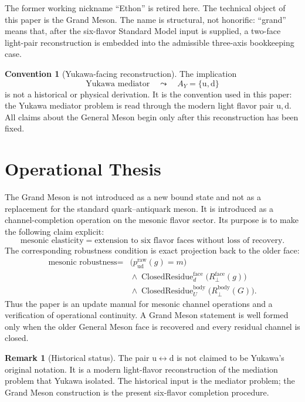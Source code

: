 \documentclass[11pt]{article}
\theoremstyle{definition}
\newtheorem{remark}[definition]{Remark}
\newtheorem{convention}[definition]{Convention}
\theoremstyle{plain}
\DeclareMathOperator{\ClosedResidue}{ClosedResidue}
\newcommand{\qu}{\mathrm u}
\newcommand{\qd}{\mathrm d}
\begin{document}
The former working nickname ``Ethon'' is retired here.  The technical
object of this paper is the Grand Meson.  The name is structural, not
honorific: ``grand'' means that, after the six-flavor Standard Model input
is supplied, a two-face light-pair reconstruction is embedded into the
admissible three-axis bookkeeping case.

\begin{convention}[Yukawa-facing reconstruction]
The implication
\[
  \text{Yukawa mediator}\quad\leadsto\quad
  A_Y=\{\qu,\qd\}
\]
is not a historical or physical derivation.  It is the convention used in
this paper: the Yukawa mediator problem is read through the modern light
flavor pair \(\qu,\qd\).  All claims about the General Meson begin only
after this reconstruction has been fixed.
\end{convention}

\section{Operational Thesis}

The Grand Meson is not introduced as a new bound state and not as a
replacement for the standard quark--antiquark meson.  It is introduced as a
channel-completion operation on the mesonic flavor sector.  Its purpose is
to make the following claim explicit:
\[
  \text{mesonic elasticity}
  =
  \text{extension to six flavor faces without loss of recovery}.
\]
The corresponding robustness condition is exact projection back to the
older face:
\[
\begin{aligned}
  \text{mesonic robustness}
  ={}&
  \bigl(p^{\mathrm{raw}}_{\qu\qd}(g)=m\bigr)
  \\
  &{}\wedge
  \ClosedResidue^{\mathrm{face}}_{d}
  \bigl(R^{\mathrm{face}}_{\perp}(g)\bigr)
  \\
  &{}\wedge
  \ClosedResidue^{\mathrm{body}}_{U}
  \bigl(R^{\mathrm{body}}_{\perp}(G)\bigr).
\end{aligned}
\]
Thus the paper is an update manual for mesonic channel operations and a
verification of operational continuity.  A Grand Meson statement is
well formed only when the older General Meson face is recovered and every
residual channel is closed.

\begin{remark}[Historical status]
The pair \(\qu\leftrightarrow\qd\) is not claimed to be Yukawa's original
notation.  It is a modern light-flavor reconstruction of the mediation
problem that Yukawa isolated.  The historical input is the mediator problem;
the Grand Meson construction is the present six-flavor completion procedure.
\end{remark}
\end{document}
